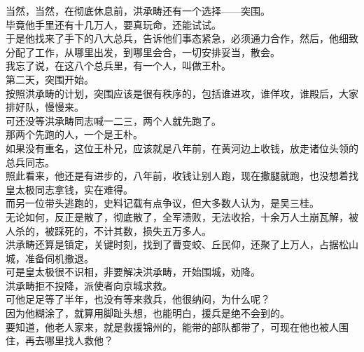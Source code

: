 \begin{multicols}{\theparacolNo}
当然，当然，在彻底休息前，洪承畴还有一个选择——突围。\\

毕竟他手里还有十几万人，要真玩命，还能试试。\\

于是他找来了手下的八大总兵，告诉他们事态紧急，必须通力合作，然后，他细致分配了工作，从哪里出发，到哪里会合，一切安排妥当，散会。\\

我忘了说，在这八个总兵里，有一个人，叫做王朴。\\

第二天，突围开始。\\

按照洪承畴的计划，突围应该是很有秩序的，包括谁进攻，谁佯攻，谁殿后，大家排好队，慢慢来。\\

可还没等洪承畴同志喊一二三，两个人就先跑了。\\

那两个先跑的人，一个是王朴。\\

如果没有重名，这位王朴兄，应该就是八年前，在黄河边上收钱，放走诸位头领的总兵同志。\\

照此看来，他还是有进步的，八年前，收钱让别人跑，现在撒腿就跑，也没想着找皇太极同志拿钱，实在难得。\\

而另一位带头逃跑的，史料记载有点争议，但大多数人认为，是吴三桂。\\

无论如何，反正是散了，彻底散了，全军溃败，无法收拾，十余万人土崩瓦解，被人杀的，被踩死的，不计其数，损失五万多人。\\

洪承畴还算是镇定，关键时刻，找到了曹变蛟、丘民仰，还聚了上万人，占据松山城，准备伺机撤退。\\

可是皇太极很不识相，非要解决洪承畴，开始围城，劝降。\\

洪承畴拒不投降，派使者向京城求救。\\

可他足足等了半年，也没有等来救兵，他很纳闷，为什么呢？\\

因为他糊涂了，就算用脚趾头想，也能明白，援兵是绝不会到的。\\

要知道，他老人家来，就是救援锦州的，能带的部队都带了，可现在他也被人围住，再去哪里找人救他？\\


\end{multicols}
